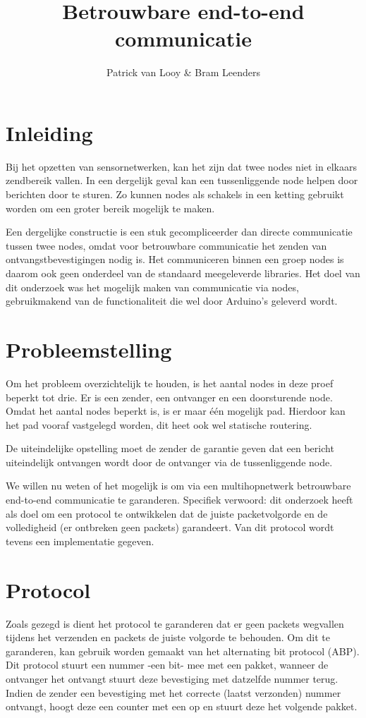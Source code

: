 \documentclass[a4paper,10pt]{article}
\title{Betrouwbare end-to-end communicatie}
\author{Patrick van Looy \& Bram Leenders}
\begin{document}
\maketitle

\section{Inleiding}
Bij het opzetten van sensornetwerken, kan het zijn dat twee nodes niet in elkaars zendbereik vallen. In een dergelijk geval kan een tussenliggende node helpen door berichten door te sturen. Zo kunnen nodes als schakels in een ketting gebruikt worden om een groter bereik mogelijk te maken.

Een dergelijke constructie is een stuk gecompliceerder dan directe communicatie tussen twee nodes, omdat voor betrouwbare communicatie het zenden van ontvangstbevestigingen nodig is. Het communiceren binnen een groep nodes is daarom ook geen onderdeel van de standaard meegeleverde libraries. Het doel van dit onderzoek was het mogelijk maken van communicatie via nodes, gebruikmakend van de functionaliteit die wel door Arduino's geleverd wordt.

\section{Probleemstelling}
Om het probleem overzichtelijk te houden, is het aantal nodes in deze proef beperkt tot drie. Er is een zender, een ontvanger en een doorsturende node. Omdat het aantal nodes beperkt is, is er maar \'e\'en mogelijk pad. Hierdoor kan het pad vooraf vastgelegd worden, dit heet ook wel statische routering.

De uiteindelijke opstelling moet de zender de garantie geven dat een bericht uiteindelijk ontvangen wordt door de ontvanger via de tussenliggende node.

We willen nu weten of het mogelijk is om via een multihopnetwerk betrouwbare end-to-end communicatie te garanderen. 
Specifiek verwoord: dit onderzoek heeft als doel om een protocol te ontwikkelen dat de juiste packetvolgorde en de volledigheid (er ontbreken geen packets) garandeert. Van dit protocol wordt tevens een implementatie gegeven.

\section{Protocol}
Zoals gezegd is dient het protocol te garanderen dat er geen packets wegvallen tijdens het verzenden en packets de juiste volgorde te behouden. Om dit te garanderen, kan gebruik worden gemaakt van het alternating bit protocol (ABP). Dit protocol stuurt een nummer -een bit- mee met een pakket, wanneer de ontvanger het ontvangt stuurt deze bevestiging met datzelfde nummer terug. Indien de zender een bevestiging met het correcte (laatst verzonden) nummer ontvangt, hoogt deze een counter met een op en stuurt deze het volgende pakket.
\end{document}
